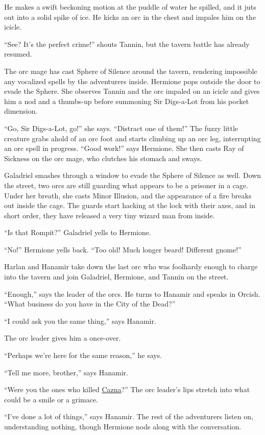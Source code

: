 \documentclass[smalldemyvopaper,11pt,twoside,onecolumn,openright,extrafontsizes]{memoir}
\begin{document}
He makes a swift beckoning motion at the puddle of water he spilled, and
it juts out into a solid spike of ice. He kicks an orc in the chest and
impales him on the icicle.

``See? It's the perfect crime!'' shouts Tannin, but the tavern battle
has already resumed.

The orc mage has cast Sphere of Silence around the tavern, rendering
impossible any vocalized spells by the adventurers inside. Hermione pops
outside the door to evade the Sphere. She observes Tannin and the orc
impaled on an icicle and gives him a nod and a thumbs-up before
summoning Sir Digs-a-Lot from his pocket dimension.

``Go, Sir Digs-a-Lot, go!'' she says. ``Distract one of them!'' The
fuzzy little creature grabs ahold of an orc foot and starts climbing up
an orc leg, interrupting an orc spell in progress. ``Good work!'' says
Hermione. She then casts Ray of Sickness on the orc mage, who clutches
his stomach and sways.

Galadriel smashes through a window to evade the Sphere of Silence as
well. Down the street, two orcs are still guarding what appears to be a
prisoner in a cage. Under her breath, she casts Minor Illusion, and the
appearance of a fire breaks out inside the cage. The guards start
hacking at the lock with their axes, and in short order, they have
released a very tiny wizard man from inside.

``Is that Rompit?'' Galadriel yells to Hermione.

``No!'' Hermione yells back. ``Too old! Much longer beard! Different
gnome!''

Harlan and Hanamir take down the last orc who was foolhardy enough to
charge into the tavern and join Galadriel, Hermione, and Tannin on the
street.

``Enough,'' says the leader of the orcs. He turns to Hanamir and speaks
in Orcish. ``What business do you have in the City of the Dead?''

``I could ask you the same thing,'' says Hanamir.

The orc leader gives him a once-over.

``Perhaps we're here for the same reason,'' he says.

``Tell me more, brother,'' says Hanamir.

``Were you the ones who killed \href{/characters/cazna/}{Cazna}?'' The
orc leader's lips stretch into what could be a smile or a grimace.

``I've done a lot of things,'' says Hanamir. The rest of the adventurers
listen on, understanding nothing, though Hermione nods along with the
conversation.
\end{document}
